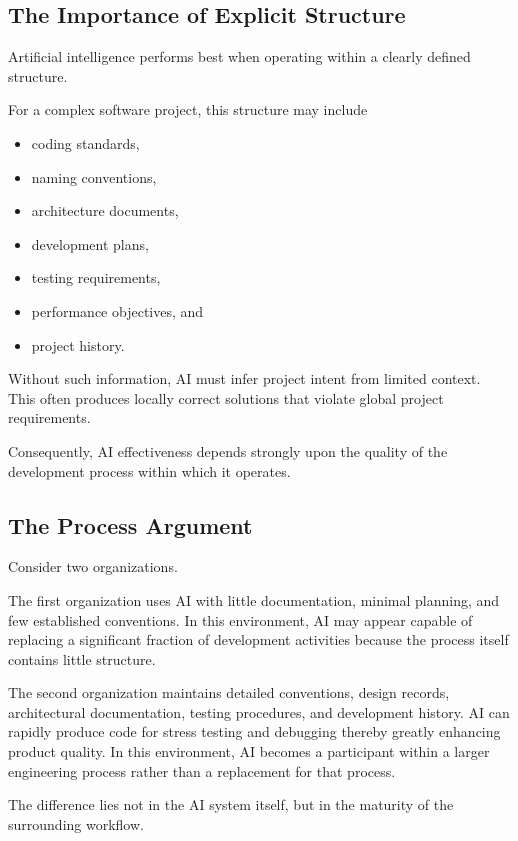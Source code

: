 \documentclass[11pt]{article}
\begin{document}
\subsection{The Importance of Explicit Structure}

Artificial intelligence performs best when operating within a clearly
defined structure.

For a complex software project, this structure may include

\begin{itemize}
\item coding standards,
\item naming conventions,
\item architecture documents,
\item development plans,
\item testing requirements,
\item performance objectives, and
\item project history.
\end{itemize}

Without such information, AI must infer project intent from limited
context. This often produces locally correct solutions that violate
global project requirements.

Consequently, AI effectiveness depends strongly upon the quality of the
development process within which it operates.

\subsection{The Process Argument}

Consider two organizations.

The first organization uses AI with little documentation,
minimal planning, and few established conventions. In this environment,
AI may appear capable of replacing a significant fraction of development
activities because the process itself contains little structure.

The second organization maintains detailed conventions, design records,
architectural documentation, testing procedures, and development
history. AI can rapidly produce code for stress testing 
and debugging thereby greatly enhancing product quality. 
In this environment, AI becomes a participant within a larger
engineering process rather than a replacement for that process.

The difference lies not in the AI system itself, but in the maturity of
the surrounding workflow.
\end{document}
